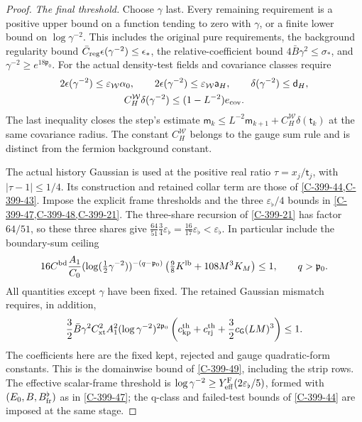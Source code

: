 \documentclass[11pt,letterpaper,reqno]{amsart}
\theoremstyle{definition}
\theoremstyle{remark}
\begin{document}
\begin{proof}
\emph{The final threshold.}
Choose $\gamma$ last. Every remaining requirement is a
positive upper bound on a function tending to zero with
$\gamma$, or a finite lower bound on $\log\gamma^{-2}$.
This includes the original pure requirements, the background
regularity bound $\bar C_{\rm reg}\epsilon(\gamma^{-2})\le\epsilon_*$,
the relative-coefficient bound $4\bar B\gamma^2\le\sigma_*$,
and $\gamma^{-2}\ge e^{18\mathfrak p_0}$.
For the actual density-test fields and covariance classes require
\[
\begin{gathered}
 2\epsilon(\gamma^{-2})\le\varepsilon_{\mathcal W}\alpha_0,
 \qquad 2\epsilon(\gamma^{-2})\le\varepsilon_{\mathcal W}\mathsf a_H,
 \qquad \delta(\gamma^{-2})\le\mathsf d_H,\\
 C_H^{\mathcal W}\delta(\gamma^{-2})
                      \le(1-L^{-2})e_{\rm cov}.
\end{gathered}
\]
The last inequality closes the step's estimate
$\mathsf m_k\le L^{-2}\mathsf m_{k+1}
+C_H^{\mathcal W}\delta(\mathsf t_k)$ at the same covariance
radius. The constant $C_H^{\mathcal W}$ belongs to the gauge
sum rule and is distinct from the fermion background constant.

The actual history Gaussian is used at the positive real
ratio $\tau=x_j/\mathsf t_j$, with $|\tau-1|\le1/4$.
Its construction and retained collar term are those of
\cref{C-399-44,C-399-43}. Impose the explicit frame thresholds
and the three $\varepsilon_\flat/4$ bounds in
\cref{C-399-47,C-399-48,C-399-21}. The three-share
recursion of \cref{C-399-21} has factor $64/51$,
so these three shares give
$\frac{64}{51}\frac34\varepsilon_\flat
=\frac{16}{17}\varepsilon_\flat<\varepsilon_\flat$.
In particular include the boundary-sum ceiling
\[
 16C^{\rm bd}\frac{A_1}{C_0}
 (\log(\tfrac12\gamma^{-2}))^{-(q-\mathfrak p_0)}
 \left(\tfrac98K^{\rm lb}+108M^3K_M\right)\le1,
 \qquad q>\mathfrak p_0.
\]
All quantities except $\gamma$ have been fixed.
The retained Gaussian mismatch requires, in addition,
\[
 \frac32\bar B\gamma^2 C_{\rm xt}^2 A_1^2
 (\log\gamma^{-2})^{2\mathfrak p_0}
 \left(c_{\rm kp}^{\rm th}+c_{\rm rj}^{\rm th}
                   +\frac32c_{\mathsf G}(LM)^3\right)\le1.
\]
The coefficients here are the fixed kept, rejected and gauge
quadratic-form constants. This is the domainwise bound of
\cref{C-399-49}, including the strip rows.
The effective scalar-frame threshold is
$\log\gamma^{-2}\ge Y_{\rm eff}^{\rm F}(2\varepsilon_\flat/5)$,
formed with $(E_0,B,B_{\rm fr}^{\flat})$ as in
\cref{C-399-47}; the q-class and failed-test bounds of
\cref{C-399-44} are imposed at the same stage.


\end{proof}
\end{document}
